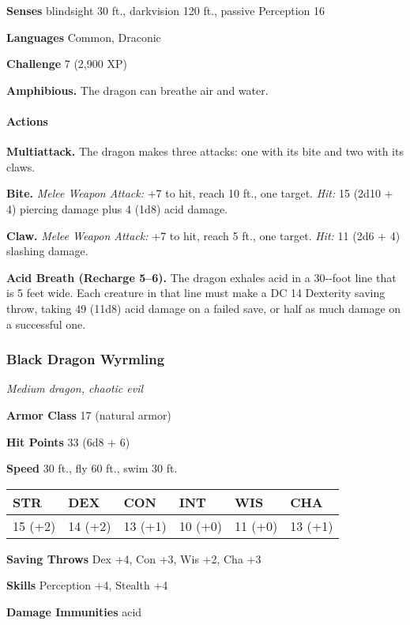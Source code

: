 \documentclass[
]{article}
\begin{document}
\textbf{Senses} blindsight 30 ft., darkvision 120 ft., passive
Perception 16

\textbf{Languages} Common, Draconic

\textbf{Challenge} 7 (2,900 XP)

\textbf{Amphibious.} The dragon can breathe air and water.

\hypertarget{actions-25}{%
\paragraph{Actions}\label{actions-25}}

\textbf{Multiattack.} The dragon makes three attacks: one with its bite
and two with its claws.

\textbf{Bite.} \emph{Melee Weapon Attack:} +7 to hit, reach 10 ft., one
target. \emph{Hit:} 15 (2d10 + 4) piercing damage plus 4 (1d8) acid
damage.

\textbf{Claw.} \emph{Melee Weapon Attack:} +7 to hit, reach 5 ft., one
target. \emph{Hit:} 11 (2d6 + 4) slashing damage.

\textbf{Acid Breath (Recharge 5--6).} The dragon exhales acid in a
30-­‐foot line that is 5 feet wide. Each creature in that line must make
a DC 14 Dexterity saving throw, taking 49 (11d8) acid damage on a failed
save, or half as much damage on a successful one.

\hypertarget{black-dragon-wyrmling}{%
\subsubsection{Black Dragon Wyrmling}\label{black-dragon-wyrmling}}

\emph{Medium dragon, chaotic evil}

\textbf{Armor Class} 17 (natural armor)

\textbf{Hit Points} 33 (6d8 + 6)

\textbf{Speed} 30 ft., fly 60 ft., swim 30 ft.

\begin{longtable}[]{@{}llllll@{}}
\toprule
STR & DEX & CON & INT & WIS & CHA\tabularnewline
\midrule
\endhead
15 (+2) & 14 (+2) & 13 (+1) & 10 (+0) & 11 (+0) & 13 (+1)\tabularnewline
\bottomrule
\end{longtable}

\textbf{Saving Throws} Dex +4, Con +3, Wis +2, Cha +3

\textbf{Skills} Perception +4, Stealth +4

\textbf{Damage Immunities} acid
\end{document}
